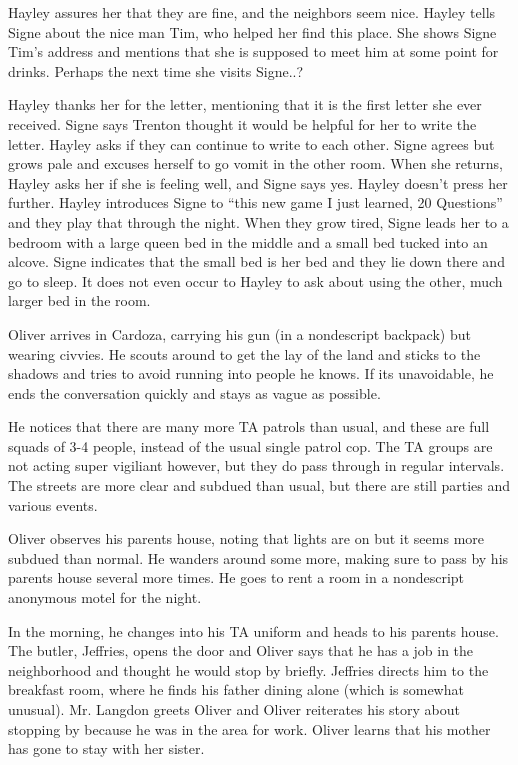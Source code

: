 Hayley assures her that they are fine, and the neighbors seem nice.  Hayley tells Signe about the nice man Tim, who helped her find this place.  She shows Signe Tim's address and mentions that she is supposed to meet him at some point for drinks.  Perhaps the next time she visits Signe..?



Hayley thanks her for the letter, mentioning that it is the first letter she ever received.  Signe says Trenton thought it would be helpful for her to write the letter.  Hayley asks if they can continue to write to each other.  Signe agrees but grows pale and excuses herself to go vomit in the other room.  When she returns, Hayley asks her if she is feeling well, and Signe says yes.  Hayley doesn't press her further.  Hayley introduces Signe to ``this new game I just learned, 20 Questions'' and they play that through the night.  When they grow tired, Signe leads her to a bedroom with a large queen bed in the middle and a small bed tucked into an alcove.  Signe indicates that the small bed is her bed and they lie down there and go to sleep.  It does not even occur to Hayley to ask about using the other, much larger bed in the room.



Oliver arrives in Cardoza, carrying his gun (in a nondescript backpack) but wearing civvies.  He scouts around to get the lay of the land and sticks to the shadows and tries to avoid running into people he knows.  If its unavoidable, he ends the conversation quickly and stays as vague as possible.  



He notices that there are many more TA patrols than usual, and these are full squads of 3-4 people, instead of the usual single patrol cop.  The TA groups are not acting super vigiliant however, but they do pass through in regular intervals.  The streets are more clear and subdued than usual, but there are still parties and various events.



Oliver observes his parents house, noting that lights are on but it seems more subdued than normal.  He wanders around some more, making sure to pass by his parents house several more times.  He goes to rent a room in a nondescript anonymous motel for the night.



In the morning, he changes into his TA uniform and heads to his parents house.  The butler, Jeffries, opens the door and Oliver says that he has a job in the neighborhood and thought he would stop by briefly.  Jeffries directs him to the breakfast room, where he finds his father dining alone (which is somewhat unusual).  Mr. Langdon greets Oliver and Oliver reiterates his story about stopping by because he was in the area for work.  Oliver learns that his mother has gone to stay with her sister.



